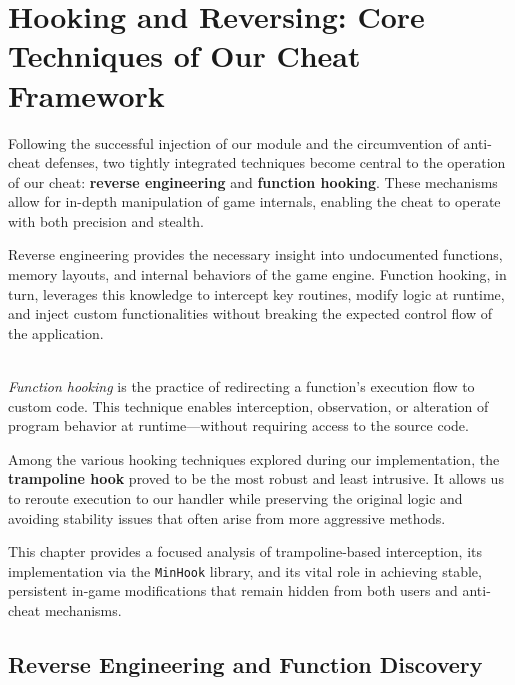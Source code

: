 \chapter{Hooking and Reversing: Core Techniques of Our Cheat Framework}

Following the successful injection of our module and the circumvention of anti-cheat defenses, two tightly integrated techniques become central to the operation of our cheat: \textbf{reverse engineering} and \textbf{function hooking}. These mechanisms allow for in-depth manipulation of game internals, enabling the cheat to operate with both precision and stealth.

Reverse engineering provides the necessary insight into undocumented functions, memory layouts, and internal behaviors of the game engine. Function hooking, in turn, leverages this knowledge to intercept key routines, modify logic at runtime, and inject custom functionalities without breaking the expected control flow of the application.

\begin{tcolorbox}[colback=gray!10, colframe=gray!50, boxrule=0pt, sharp corners, width=\linewidth, left=1mm, right=1mm, top=0.5mm, bottom=0.5mm]
 \\
\textit{Function hooking} is the practice of redirecting a function's execution flow to custom code. This technique enables interception, observation, or alteration of program behavior at runtime—without requiring access to the source code.
\end{tcolorbox}

Among the various hooking techniques explored during our implementation, the \textbf{trampoline hook} proved to be the most robust and least intrusive. It allows us to reroute execution to our handler while preserving the original logic and avoiding stability issues that often arise from more aggressive methods.

This chapter provides a focused analysis of trampoline-based interception, its implementation via the \texttt{MinHook} library, and its vital role in achieving stable, persistent in-game modifications that remain hidden from both users and anti-cheat mechanisms.

\section{Reverse Engineering and Function Discovery}

